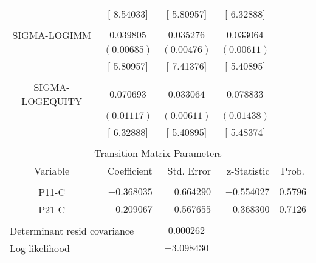 \begin{tabular}{lrrrr}
\multicolumn{1}{c}{}&\multicolumn{1}{c}{[ 8.54033]}&\multicolumn{1}{c}{[ 5.80957]}&\multicolumn{1}{c}{[ 6.32888]}&\multicolumn{1}{c}{}\\
\multicolumn{1}{c}{}&\multicolumn{1}{c}{}&\multicolumn{1}{c}{}&\multicolumn{1}{c}{}&\multicolumn{1}{c}{}\\
\multicolumn{1}{c}{SIGMA-LOGIMM}&\multicolumn{1}{c}{$0.039805$}&\multicolumn{1}{c}{$0.035276$}&\multicolumn{1}{c}{$0.033064$}&\multicolumn{1}{c}{}\\
\multicolumn{1}{c}{}&\multicolumn{1}{c}{$(0.00685)$}&\multicolumn{1}{c}{$(0.00476)$}&\multicolumn{1}{c}{$(0.00611)$}&\multicolumn{1}{c}{}\\
\multicolumn{1}{c}{}&\multicolumn{1}{c}{[ 5.80957]}&\multicolumn{1}{c}{[ 7.41376]}&\multicolumn{1}{c}{[ 5.40895]}&\multicolumn{1}{c}{}\\
\multicolumn{1}{c}{}&\multicolumn{1}{c}{}&\multicolumn{1}{c}{}&\multicolumn{1}{c}{}&\multicolumn{1}{c}{}\\
\multicolumn{1}{c}{SIGMA-LOGEQUITY}&\multicolumn{1}{c}{$0.070693$}&\multicolumn{1}{c}{$0.033064$}&\multicolumn{1}{c}{$0.078833$}&\multicolumn{1}{c}{}\\
\multicolumn{1}{c}{}&\multicolumn{1}{c}{$(0.01117)$}&\multicolumn{1}{c}{$(0.00611)$}&\multicolumn{1}{c}{$(0.01438)$}&\multicolumn{1}{c}{}\\
\multicolumn{1}{c}{}&\multicolumn{1}{c}{[ 6.32888]}&\multicolumn{1}{c}{[ 5.40895]}&\multicolumn{1}{c}{[ 5.48374]}&\multicolumn{1}{c}{}\\
[4.5pt] \hline \\ [-4.5pt]
\multicolumn{5}{c}{Transition Matrix Parameters}\\
\multicolumn{1}{c}{Variable}&\multicolumn{1}{r}{Coefficient}&\multicolumn{1}{r}{Std. Error}&\multicolumn{1}{r}{z-Statistic}&\multicolumn{1}{c}{Prob.}\\
[4.5pt] \hline \\ [-4.5pt]
\multicolumn{1}{c}{P11-C}&\multicolumn{1}{r}{$-0.368035$}&\multicolumn{1}{r}{$0.664290$}&\multicolumn{1}{r}{$-0.554027$}&\multicolumn{1}{c}{$0.5796$}\\
\multicolumn{1}{c}{P21-C}&\multicolumn{1}{r}{$0.209067$}&\multicolumn{1}{r}{$0.567655$}&\multicolumn{1}{r}{$0.368300$}&\multicolumn{1}{c}{$0.7126$}\\
[4.5pt] \hline \\ [-4.5pt]
\multicolumn{2}{l}{Determinant resid covariance}&\multicolumn{1}{c}{$0.000262$}&\multicolumn{1}{c}{}&\multicolumn{1}{c}{}\\
\multicolumn{1}{l}{Log likelihood}&\multicolumn{1}{c}{}&\multicolumn{1}{c}{$-3.098430$}&\multicolumn{1}{c}{}&\multicolumn{1}{c}{}\\

\end{tabular}
